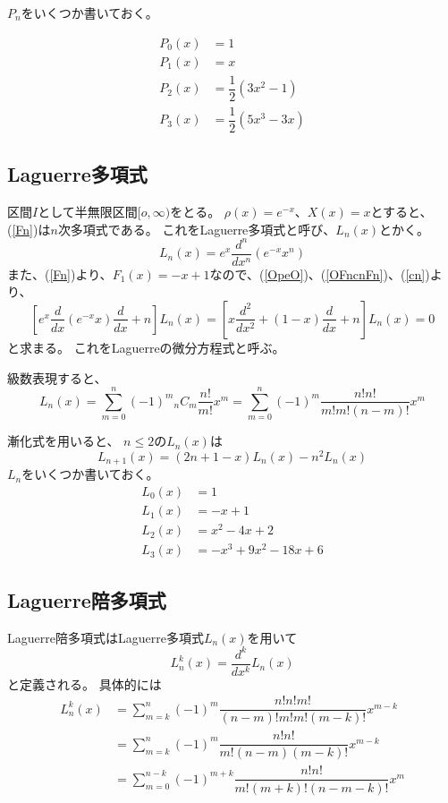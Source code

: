 $P_n$をいくつか書いておく。

\begin{align}
  P_0(x) &= 1 \\
  P_1(x) &= x \\
  P_2(x) &= \dfrac{1}{2}(3x^2 - 1) \\
  P_3(x) &= \dfrac{1}{2}(5x^3 - 3x)
\end{align}

\subsection{Laguerre多項式}
区間$I$として半無限区間$[o,\infty)$をとる。
  $\rho(x) = e^{-x}$、$X(x) = x$とすると、(\ref{Fn})は$n$次多項式である。
  これをLaguerre多項式と呼び、$L_n(x)$とかく。
  \begin{equation}
    \label{laguerre_polynomials}
    L_n(x) = e^x\dfrac{d^n}{dx^n}(e^{-x}x^n)
  \end{equation}
  また、(\ref{Fn})より、$F_1(x) = -x+1$なので、(\ref{OpeO})、(\ref{OFncnFn})、(\ref{cn})より、
  \begin{equation}
    \label{laguerre_DE}
    \left[ e^x\dfrac{d}{dx}(e^{-x}x)\dfrac{d}{dx} + n\right]L_n(x) = \left[ x\dfrac{d^2}{dx^2} + (1-x)\dfrac{d}{dx} + n\right]L_n(x) = 0
  \end{equation}
  と求まる。
  これをLaguerreの微分方程式と呼ぶ。

  級数表現すると、
  \begin{equation}
    L_n(x) = \sum_{m = 0}^n (-1)^m {}_nC_m\dfrac{n!}{m!}x^m = \sum_{m = 0}^n (-1)^m\dfrac{n!n!}{m!m!(n-m)!}x^m
  \end{equation}

  漸化式を用いると、
  $n \leq 2$の$L_n(x)$は
  \begin{equation}
    L_{n+1}(x) = (2n + 1 -x)L_n(x) - n^2L_n(x)
  \end{equation}
  $L_n$をいくつか書いておく。
  \begin{align}
    L_0(x) &= 1 \\
    L_1(x) &= -x + 1 \\
    L_2(x) &= x^2 -4x + 2 \\
    L_3(x) &= -x^3 + 9x^2 -18x + 6
  \end{align}

  \subsection{Laguerre陪多項式}
  Laguerre陪多項式はLaguerre多項式$L_n(x)$を用いて
  \begin{equation}
    L_n^k(x) = \dfrac{d^k}{dx^k}L_n(x)
  \end{equation}
  と定義される。
  具体的には
  \begin{align}
    L_n^k(x) &= \sum_{m=k}^{n}(-1)^m \dfrac{n!n!m!}{(n-m)!m!m!(m-k)!}x^{m-k} \\
    &= \sum_{m=k}^{n}(-1)^m \dfrac{n!n!}{m!(n-m)(m-k)!}x^{m-k} \\
    &= \sum_{m=0}^{n-k}(-1)^{m+k} \dfrac{n!n!}{m!(m+k)!(n-m-k)!}x^{m}
  \end{align}

